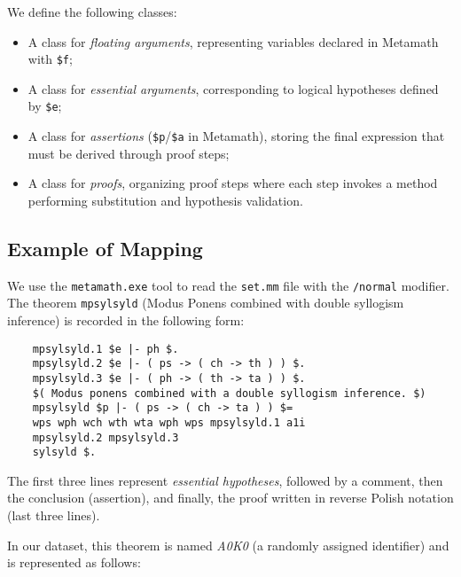 We define the following classes:  
\begin{itemize}
    \item A class for \textit{floating arguments}, representing variables declared in Metamath with \texttt{\$f};
    \item A class for \textit{essential arguments}, corresponding to logical hypotheses defined by \texttt{\$e};
    \item A class for \textit{assertions} (\texttt{\$p}/\texttt{\$a} in Metamath), storing the final expression that
    must be derived through proof steps;
    \item A class for \textit{proofs}, organizing proof steps where each step invokes a method performing
    substitution and hypothesis validation.
\end{itemize}  

\subsection{Example of Mapping}

We use the \texttt{metamath.exe} tool to read the \texttt{set.mm} file with the \texttt{/normal} modifier.  
The theorem \texttt{mpsylsyld} (Modus Ponens combined with double syllogism inference) is recorded in the following form:  

\begin{verbatim}
    mpsylsyld.1 $e |- ph $.
    mpsylsyld.2 $e |- ( ps -> ( ch -> th ) ) $.
    mpsylsyld.3 $e |- ( ph -> ( th -> ta ) ) $.
    $( Modus ponens combined with a double syllogism inference. $)
    mpsylsyld $p |- ( ps -> ( ch -> ta ) ) $=
    wps wph wch wth wta wph wps mpsylsyld.1 a1i
    mpsylsyld.2 mpsylsyld.3
    sylsyld $.
\end{verbatim}

The first three lines represent \textit{essential hypotheses}, followed by a comment, then the conclusion (assertion),
and finally, the proof written in reverse Polish notation (last three lines).

In our dataset, this theorem is named \textit{A0K0} (a randomly assigned identifier) and is represented as follows:

